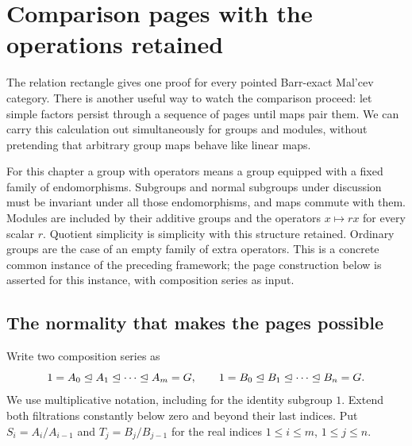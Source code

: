 \section{Comparison pages with the operations retained}
\label{p:chapter}

The relation rectangle gives one proof for every pointed Barr-exact
Mal'cev category. There is another useful way to watch the comparison
proceed: let simple factors persist through a sequence of pages until
maps pair them. We can carry this calculation out simultaneously for
groups and modules, without pretending that arbitrary group maps behave
like linear maps.

For this chapter a group with operators means a group equipped with a
fixed family of endomorphisms. Subgroups and normal subgroups under
discussion must be invariant under all those endomorphisms, and maps
commute with them. Modules are included by their additive groups and the
operators $x\mapsto rx$ for every scalar $r$. Quotient simplicity is
simplicity with this structure retained. Ordinary groups are the case
of an empty family of extra operators. This is a concrete common instance
of the preceding framework; the page construction below is asserted for
this instance, with composition series as input.

\subsection{The normality that makes the pages possible}

Write two composition series as
\[
1=A_0\trianglelefteq A_1\trianglelefteq\cdots\trianglelefteq A_m=G,
\qquad
1=B_0\trianglelefteq B_1\trianglelefteq\cdots\trianglelefteq B_n=G.
\]
We use multiplicative notation, including for the identity subgroup $1$.
Extend both filtrations constantly below zero and beyond their last
indices. Put $S_i=A_i/A_{i-1}$ and $T_j=B_j/B_{j-1}$ for the real
indices $1\leq i\leq m$, $1\leq j\leq n$.

